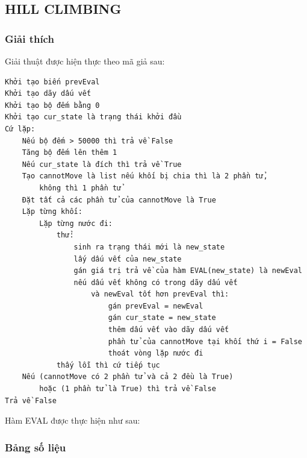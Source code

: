 \documentclass[a4paper, 11pt]{article}
\begin{document}
\subsection{HILL CLIMBING}
\subsubsection{Giải thích}
Giải thuật được hiện thực theo mã giả sau:
\begin{verbatim}
Khởi tạo biến prevEval
Khởi tạo dãy dấu vết
Khởi tạo bộ đếm bằng 0
Khởi tạo cur_state là trạng thái khởi đầu
Cứ lặp:
    Nếu bộ đếm > 50000 thì trả về False
    Tăng bộ đếm lên thêm 1
    Nếu cur_state là đích thì trả về True
    Tạo cannotMove là list nếu khối bị chia thì là 2 phần tử, 
        không thì 1 phần tử
    Đặt tất cả các phần tử của cannotMove là True
    Lặp từng khối:
        Lặp từng nước đi:
            thử:
                sinh ra trạng thái mới là new_state
                lấy dấu vết của new_state
                gán giá trị trả về của hàm EVAL(new_state) là newEval 
                nếu dấu vết không có trong dãy dấu vết 
                    và newEval tốt hơn prevEval thì:
                        gán prevEval = newEval
                        gán cur_state = new_state
                        thêm dấu vết vào dãy dấu vết
                        phần tử của cannotMove tại khối thứ i = False
                        thoát vòng lặp nước đi
            thấy lỗi thì cứ tiếp tục
    Nếu (cannotMove có 2 phần tử và cả 2 đều là True) 
        hoặc (1 phần tử là True) thì trả về False
Trả về False
\end{verbatim}
Hàm EVAL được thực hiện như sau:
\subsubsection{Bảng số liệu}
\end{document}
